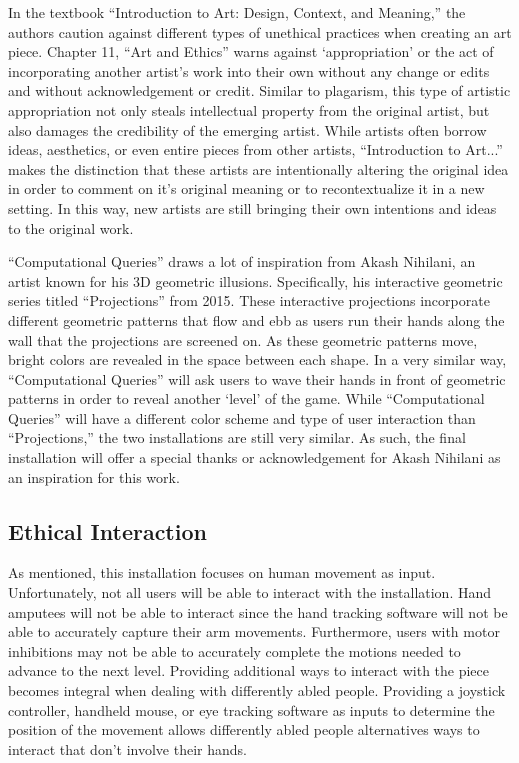 \documentclass[10pt,twocolumn]{article}
\begin{document}
In the textbook ``Introduction to Art: Design, Context, and Meaning,'' \cite{blood_introduction_nodate}the authors caution against different types of unethical practices when creating an art piece.  Chapter 11, ``Art and Ethics'' warns against `appropriation' or the act of incorporating another artist's work into their own without any change or edits and without acknowledgement or credit. Similar to plagarism, this type of artistic appropriation not only steals intellectual property from the original artist, but also damages the credibility of the emerging artist.  While artists often borrow ideas, aesthetics, or even entire pieces from other artists, ``Introduction to Art...'' makes the distinction that these artists are intentionally altering the original idea in order to comment on it's original meaning or to recontextualize it in a new setting. In this way, new artists are still bringing their own intentions and ideas to the original work.  

``Computational Queries'' draws a lot of inspiration from Akash Nihilani, an artist known for his 3D geometric illusions. Specifically, his interactive geometric series titled ``Projections'' from 2015.  These interactive projections incorporate different geometric patterns that flow and ebb as users run their hands along the wall that the projections are screened on. As these geometric patterns move, bright colors are revealed in the space between each shape.  In a very similar way, ``Computational Queries'' will ask users to wave their hands in front of geometric patterns in order to reveal another `level' of the game.  While ``Computational Queries'' will have a different color scheme and type of user interaction than ``Projections,'' the two installations are still very similar.  As such, the final installation will offer a special thanks or acknowledgement for Akash Nihilani as an inspiration for this work. 

\subsection{Ethical Interaction}\label{sec:interaction}

As mentioned, this installation focuses on human movement as input.  Unfortunately, not all users will be able to interact with the installation.  Hand amputees will not be able to interact since the hand tracking software will not be able to accurately capture their arm movements. Furthermore, users with motor inhibitions may not be able to accurately complete the motions needed to advance to the next level.  Providing additional ways to interact with the piece becomes integral when dealing with differently abled people. Providing a joystick controller, handheld mouse, or eye tracking software as inputs to determine the position of the movement allows differently abled people alternatives ways to interact that don't involve their hands. 
\end{document}
